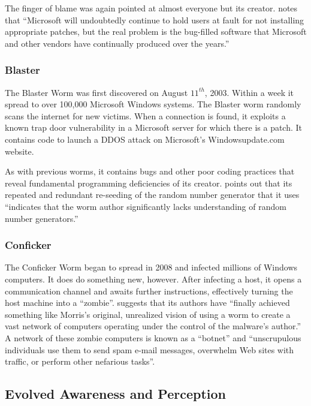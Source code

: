 The finger of blame was again pointed at almost everyone but
its creator. \cite{schultz_security_2003} notes that ``Microsoft will undoubtedly
continue to hold users at fault for not installing
appropriate patches, but the real problem is the
bug-filled software that Microsoft and other
vendors have continually produced over the
years.'' 

\subsubsection*{Blaster}
The Blaster Worm was first discovered on August $11^{th}$, 2003. Within a week
it spread to over 100,000 Microsoft Windows systems. The Blaster worm randomly
scans the internet for new victims. When a connection is found, it exploits a
known trap door vulnerability in a Microsoft server for which there is a
patch. It contains code to launch a DDOS attack on Microsoft's Windowsupdate.com
website\cite{bailey_blaster_2005}. 

As with previous worms, it contains bugs and other poor coding practices that
reveal fundamental programming deficiencies of its creator. 
\cite{bailey_blaster_2005} points out that its repeated and redundant re-seeding
of the random number generator that it uses ``indicates that the worm author
significantly lacks understanding of random number generators.''

\subsubsection*{Conficker}
The Conficker Worm began to spread in 2008 and infected millions of Windows
computers. It does do something new, however. After
infecting a host, it opens a communication channel and awaits further
instructions, effectively turning the host machine into a ``zombie''. 
\cite{lee_washpost_2013} suggests that its authors have ``finally achieved
something like Morris's original, unrealized vision of using a worm to create a
vast network of computers operating under the control of the malware's author.''
A network of these zombie computers is known as a ``botnet'' and ``unscrupulous
individuals use them to send spam e-mail messages, overwhelm Web sites with
traffic, or perform other nefarious tasks''\cite{lee_washpost_2013}.
		
\subsection*{Evolved Awareness and Perception}

